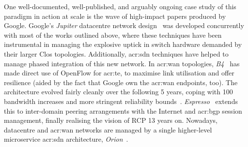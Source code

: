 One well-documented, well-published, and arguably ongoing case study of this paradigm in action at scale is the wave of high-impact papers produced by Google.
Google's \emph{Jupiter} datacentre network design~\parencite{DBLP:conf/sigcomm/SinghOAAABBDFGK15} was developed concurrently with most of the works outlined above, where these techniques have been instrumental in managing the explosive uptick in switch hardware demanded by their larger Clos topologies.
Additionally, \gls{acr:sdn} techniques have helped to manage phased integration of this new network.
In \gls{acr:wan} topologies, \emph{B4}~\parencite{DBLP:conf/sigcomm/JainKMOPSVWZZZHSV13} has made direct use of OpenFlow for \gls{acr:te}, to maximise link utilisation and offer resilience (aided by the fact that Google own the \gls{acr:wan} endpoints, too).
The architecture evolved fairly cleanly over the following 5 years, coping with \qty{100}{\times} bandwidth increases and more stringent reliability bounds~\parencite{DBLP:conf/sigcomm/HongMAZABBJKLMP18}.
\emph{Espresso}~\parencite{DBLP:conf/sigcomm/YapMRPHBHKNJLRR17} extends this to inter-domain peering arrangements with the Internet and \gls{acr:bgp} session management, finally realising the vision of RCP 13 years on.
Nowadays, datacentre and \gls{acr:wan} networks are managed by a single higher-level microservice \gls{acr:sdn} architecture, \emph{Orion}~\parencite{DBLP:conf/nsdi/FergusonGHKMMOP21}.

